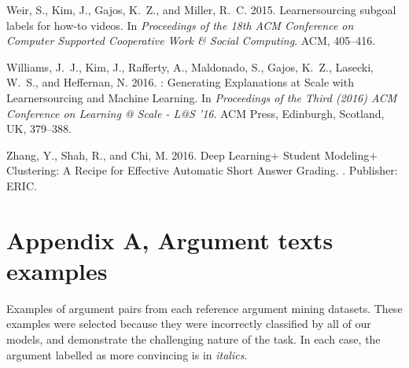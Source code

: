 \documentclass[notitlepage,12pt]{jedm}
\begin{document}
\begin{thebibliography}{}
{\sc Weir, S.}, {\sc Kim, J.}, {\sc Gajos, K.~Z.}, {\sc and} {\sc Miller,
  R.~C.} 2015.
\newblock Learnersourcing subgoal labels for how-to videos.
\newblock In {\em Proceedings of the 18th {ACM} {Conference} on {Computer}
  {Supported} {Cooperative} {Work} \& {Social} {Computing}}. ACM, 405--416.

{\sc Williams, J.~J.}, {\sc Kim, J.}, {\sc Rafferty, A.}, {\sc Maldonado, S.},
  {\sc Gajos, K.~Z.}, {\sc Lasecki, W.~S.}, {\sc and} {\sc Heffernan, N.} 2016.
: {Generating} {Explanations} at {Scale} with {Learnersourcing}
  and {Machine} {Learning}.
\newblock In {\em Proceedings of the {Third} (2016) {ACM} {Conference} on
  {Learning} @ {Scale} - {L}@{S} '16}. ACM Press, Edinburgh, Scotland, UK,
  379--388.

{\sc Zhang, Y.}, {\sc Shah, R.}, {\sc and} {\sc Chi, M.} 2016.
\newblock Deep {Learning}+ {Student} {Modeling}+ {Clustering}: {A} {Recipe} for
  {Effective} {Automatic} {Short} {Answer} {Grading}.
.
\newblock Publisher: ERIC.

\end{thebibliography}

\newpage
\section*{Appendix A, Argument texts examples}

\begin{table}[h!]
	\caption{
		Examples of argument pairs from each reference argument mining 
		datasets. 
		These examples were selected because they were incorrectly classified 
		by all of our models, and demonstrate the challenging nature of the 
		task. 
		In each case, the argument labelled as more convincing is in 
		\textit{italics}.
	}
	\label{tab:sample_obs}
	\begin{subtable}[t]{\textwidth}
		
	\end{subtable}
	\begin{subtable}[t]{\textwidth}
		
	\end{subtable}
\end{table}
\end{document}
